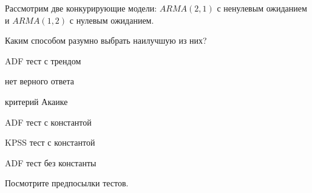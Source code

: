 
\begin{question}
Рассмотрим две конкурирующие модели: \(ARMA(2, 1)\) с ненулевым ожиданием
и \(ARMA(1, 2)\) с нулевым ожиданием.

Каким способом разумно выбрать наилучшую из них?
\begin{answerlist}
  \item ADF тест с трендом
  \item нет верного ответа
  \item критерий Акаике
  \item ADF тест с константой
  \item KPSS тест с константой
  \item ADF тест без константы
\end{answerlist}
\end{question}

\begin{solution}
Посмотрите предпосылки тестов.
\end{solution}

